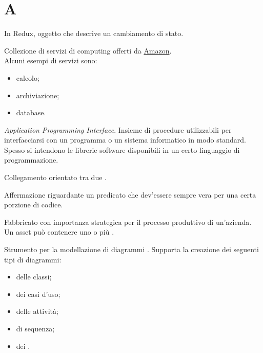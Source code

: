 \section{A}

	In Redux, oggetto che descrive un cambiamento di stato.

Collezione di servizi di  computing offerti da \href{https://aws.amazon.com/it/}{Amazon}. \\
Alcuni esempi di servizi sono:
\begin{itemize}
	\item calcolo;
	\item archiviazione;
	\item database.
\end{itemize}

\textit{Application Programming Interface}. Insieme di procedure utilizzabili per interfacciarsi con un programma o un sistema informatico in modo standard. Spesso si intendono le librerie software disponibili in un certo linguaggio di programmazione.

Collegamento orientato tra due .

Affermazione riguardante un predicato che dev'essere sempre vera per una certa porzione di codice.

Fabbricato con importanza strategica per il processo produttivo di un'azienda. Un asset può contenere uno o più .

Strumento per la modellazione di diagrammi . Supporta la creazione dei seguenti tipi di diagrammi:
\begin{itemize}
	\item delle classi;
	\item dei casi d'uso;
	\item delle attività;
	\item di sequenza;
	\item dei .
\end{itemize} 
